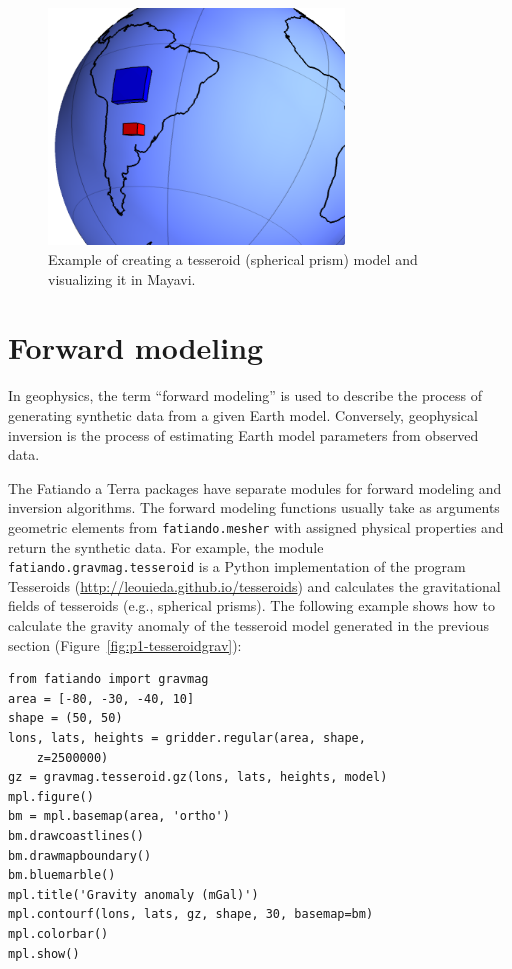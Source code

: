 \begin{figure}
    \centering
    \includegraphics[width=0.7\textwidth]{figures/paper-fatiando/meshes_3dplotting_tesseroid}
    \caption{
        Example of creating a tesseroid (spherical prism) model and visualizing
        it in Mayavi.
    }
    \label{fig:p1-tesseroid}
\end{figure}




\section{Forward modeling}

In geophysics, the term ``forward modeling'' is used to describe the
process of generating synthetic data from a given Earth model.
Conversely, geophysical inversion is the process of estimating Earth
model parameters from observed data.

The Fatiando a Terra packages have separate modules for forward modeling
and inversion algorithms. The forward modeling functions usually take as
arguments geometric elements from \texttt{fatiando.mesher} with assigned
physical properties and return the synthetic data. For example, the
module \texttt{fatiando.gravmag.tesseroid} is a Python implementation of
the program Tesseroids (\url{http://leouieda.github.io/tesseroids}) and
calculates the gravitational fields of tesseroids (e.g., spherical
prisms). The following example shows how to calculate the gravity
anomaly of the tesseroid model generated in the previous section
(Figure~\ref{fig:p1-tesseroidgrav}):

\begin{verbatim}
from fatiando import gravmag
area = [-80, -30, -40, 10]
shape = (50, 50)
lons, lats, heights = gridder.regular(area, shape,
    z=2500000)
gz = gravmag.tesseroid.gz(lons, lats, heights, model)
mpl.figure()
bm = mpl.basemap(area, 'ortho')
bm.drawcoastlines()
bm.drawmapboundary()
bm.bluemarble()
mpl.title('Gravity anomaly (mGal)')
mpl.contourf(lons, lats, gz, shape, 30, basemap=bm)
mpl.colorbar()
mpl.show()
\end{verbatim}

